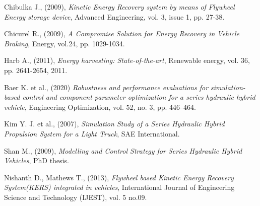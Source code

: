 \documentclass[11pt]{article}
\begin{document}

\newpage

\begin{thebibliography}{60}
	
	
	
	
	
	Chibulka J., (2009), \textit{Kinetic Energy Recovery system by means of Flywheel Energy 		    storage device}, Advanced Engineering, vol. 3, issue 1, pp. 27-38.
	
	Chicurel R., (2009),  \textit{A Compromise Solution for Energy Recovery in Vehicle Braking}, Energy, vol.24, pp. 1029-1034.
	
	Harb A., (2011), \textit{Energy harvesting: State-of-the-art}, 
	Renewable energy, vol. 36, pp. 2641-2654, 2011.
	
	Baer K. et al., (2020) \textit{Robustness and performance evaluations for simulation-based 		control and component parameter optimization for a series hydraulic hybrid vehicle}, Engineering Optimization, vol. 52, no. 3, pp. 446–464.	
	
	Kim Y. J. et al., (2007), \textit{Simulation Study of a Series Hydraulic Hybrid Propulsion 					System for a Light Truck}, SAE International.
	
	Shan M., (2009), \textit{Modelling and Control Strategy for Series Hydraulic Hybrid 				Vehicles}, PhD thesis.
	
	Nishanth D., Mathews T., (2013), \textit{Flywheel based Kinetic Energy Recovery System(KERS) 	    integrated in vehicles}, International Journal of Engineering Science and Technology (IJEST), vol. 5 no.09.
	

\end{thebibliography}
\end{document}
